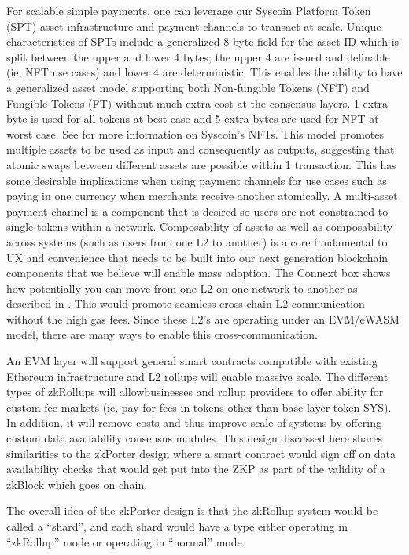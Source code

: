\documentclass[peerreview]{ieeesyscoin}
\begin{document}
For scalable simple payments, one can leverage our Syscoin Platform Token (SPT) asset infrastructure and payment channels to transact at scale. Unique characteristics of SPTs include a generalized 8 byte field for the asset ID which is split between the upper and lower 4 bytes; the upper 4 are issued and definable (ie, NFT use cases) and lower 4 are deterministic. This enables the ability to have a generalized asset model supporting both Non-fungible Tokens (NFT) and Fungible Tokens (FT) without much extra cost at the consensus layers. 1 extra byte is used for all tokens at best case and 5 extra bytes are used for NFT at worst case. See \cite{NFT21} for more information on Syscoin’s NFTs. This model promotes multiple assets to be used as input and consequently as outputs, suggesting that  atomic swaps between different assets are possible within 1 transaction. This has some desirable implications when using payment channels for use cases such as paying in one currency when merchants receive another atomically. A multi-asset payment channel is a component that is desired so users are not constrained to single tokens within a network. Composability of assets as well as composability across systems (such as users from one L2 to another) is a core fundamental to UX and convenience that needs to be built into our next generation blockchain components that we believe will enable mass adoption. The Connext box shows how potentially you can move from one L2 on one network to another as described in \cite{Bhu21}. This would promote seamless cross-chain L2 communication without the high gas fees. Since these L2’s are operating under an EVM/eWASM model, there are many ways to enable this cross-communication.

An EVM layer will support general smart contracts compatible with existing Ethereum infrastructure and L2 rollups will enable massive scale. The different types of zkRollups will allowbusinesses and rollup providers to offer ability for custom fee markets (ie, pay for fees in tokens other than base layer token SYS). In addition, it will remove costs and thus improve scale of systems by offering custom data availability consensus modules. This design discussed here shares similarities to the zkPorter design where a smart contract would sign off on data availability checks that would get put into the ZKP as part of the validity of a zkBlock which goes on chain.

The overall idea of the zkPorter design is that the zkRollup system would be called a “shard”, and each shard would have a type either operating in “zkRollup” mode or operating in “normal” mode. 
\end{document}
